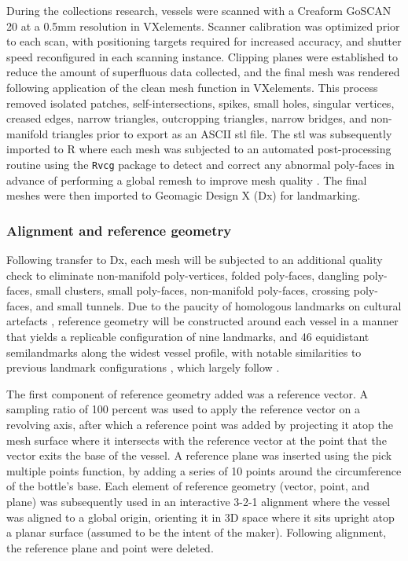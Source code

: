 \documentclass[]{interact}
\theoremstyle{plain}%
\theoremstyle{definition}
\theoremstyle{remark}
\begin{document}
During the collections research, vessels were scanned with a Creaform
GoSCAN 20 at a 0.5mm resolution in VXelements. Scanner calibration was
optimized prior to each scan, with positioning targets required for
increased accuracy, and shutter speed reconfigured in each scanning
instance. Clipping planes were established to reduce the amount of
superfluous data collected, and the final mesh was rendered following
application of the clean mesh function in VXelements. This process
removed isolated patches, self-intersections, spikes, small holes,
singular vertices, creased edges, narrow triangles, outcropping
triangles, narrow bridges, and non-manifold triangles prior to export as
an ASCII stl file. The stl was subsequently imported to R where each
mesh was subjected to an automated post-processing routine using the
\texttt{Rvcg} package to detect and correct any abnormal poly-faces in
advance of performing a global remesh to improve mesh quality
\citep{RN8497}. The final meshes were then imported to Geomagic Design X
(Dx) for landmarking.

\hypertarget{alignment-and-reference-geometry}{%
\subsubsection{Alignment and reference
geometry}\label{alignment-and-reference-geometry}}

Following transfer to Dx, each mesh will be subjected to an additional
quality check to eliminate non-manifold poly-vertices, folded
poly-faces, dangling poly-faces, small clusters, small poly-faces,
non-manifold poly-faces, crossing poly-faces, and small tunnels. Due to
the paucity of homologous landmarks on cultural artefacts
\citep{RN8521}, reference geometry will be constructed around each
vessel in a manner that yields a replicable configuration of nine
landmarks, and 46 equidistant semilandmarks along the widest vessel
profile, with notable similarities to previous landmark configurations
\citep{RN7039,RN7925,RN8071,RN8361,RN8967,RN7588}, which largely follow
\citet{RN5700}.

The first component of reference geometry added was a reference vector.
A sampling ratio of 100 percent was used to apply the reference vector
on a revolving axis, after which a reference point was added by
projecting it atop the mesh surface where it intersects with the
reference vector at the point that the vector exits the base of the
vessel. A reference plane was inserted using the pick multiple points
function, by adding a series of 10 points around the circumference of
the bottle's base. Each element of reference geometry (vector, point,
and plane) was subsequently used in an interactive 3-2-1 alignment where
the vessel was aligned to a global origin, orienting it in 3D space
where it sits upright atop a planar surface (assumed to be the intent of
the maker). Following alignment, the reference plane and point were
deleted.
\end{document}
